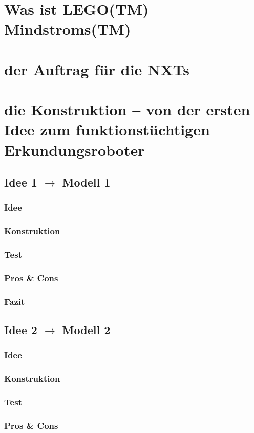 \section{Was ist LEGO(TM) Mindstroms(TM)}
\section{der Auftrag für die NXTs}
\section{die Konstruktion -- von der ersten Idee zum funktionstüchtigen Erkundungsroboter}
\subsection{Idee 1 $\rightarrow$ Modell 1}%
\subsubsection{Idee}
\subsubsection{Konstruktion}
\subsubsection{Test}
\subsubsection{Pros \& Cons}
\subsubsection{Fazit}
\subsection{Idee 2 $\rightarrow$ Modell 2}%
\subsubsection{Idee}
\subsubsection{Konstruktion}
\subsubsection{Test}
\subsubsection{Pros \& Cons}
